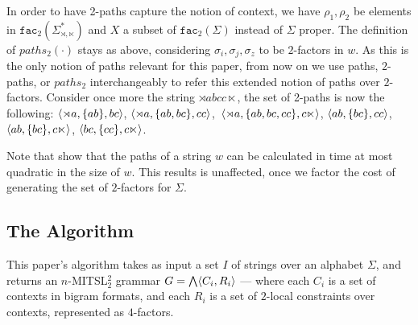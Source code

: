 \documentclass[11pt,a4paper]{article}
\newcommand{\facn}[1]{\ensuremath{\texttt{fac}_{#1}}}
\begin{document}
In order to have 2-paths capture the notion of context, we  have   $\rho_1, \rho_2$ be elements in $ \facn{2}(\Sigma^*_{\rtimes,\ltimes})$ and $X$ a subset of $ \facn{2}(\Sigma)$ instead of $\Sigma$ proper.\@
The definition of $paths_2(\cdot)$ stays as above, considering $\sigma_i,\sigma_j,\sigma_z$ to be $2$-factors in $w$.\@
As this is the only notion of paths relevant for this paper, from now on we use paths, $2$-paths, or $paths_2$ interchangeably to refer this extended notion of paths over $2$-factors.
Consider once more the string $\rtimes abcc\ltimes$,  the set of  2-paths is now the following: 
$\langle{\rtimes a, \{ab\}, bc}\rangle$, $\langle{\rtimes a, \{ab,bc\}, cc}\rangle$,~$\langle{\rtimes a, \{ab,bc,cc\}, c\ltimes}\rangle$, $\langle{ab, \{bc\}, cc}\rangle$, $\langle{ab, \{bc\}, c\ltimes}\rangle$, $\langle{bc,  \{cc\}, c\ltimes}\rangle$.\@ 

Note that  \citet{JardineHeinz16} show that the paths of a string $w$ can be calculated in time at most quadratic in the size of $w$.\@
This results is unaffected, once we factor the cost of generating the set of $2$-factors for $\Sigma$.


\subsection{The Algorithm}

This paper's algorithm  takes as input a set $I$ of strings over an alphabet $\Sigma$, and returns an $n$-MITSL$^2_2$ grammar $G=\bigwedge\langle{C_i,R_i}\rangle$ --- where each $C_i$ is a set of contexts in bigram formats, and each $R_i$ is a set of $2$-local constraints over contexts, represented as $4$-factors.
\end{document}
